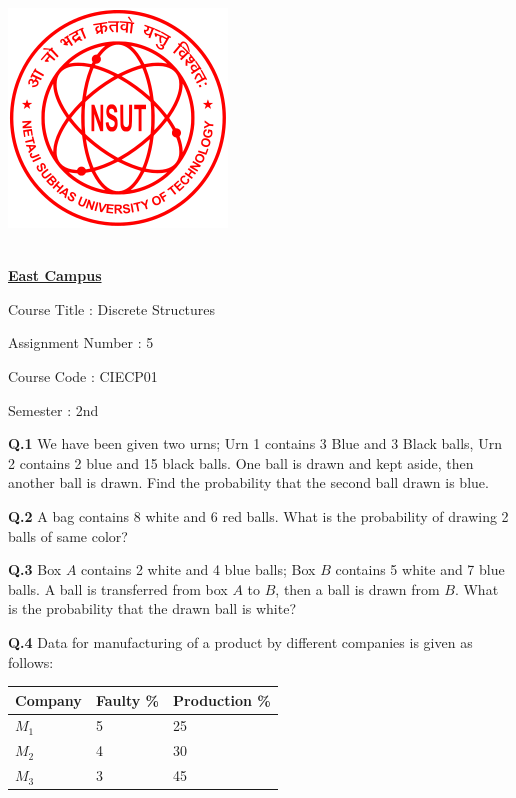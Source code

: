 \documentclass[11pt]{exam}
\begin{document}
\begin{center}
    \includegraphics[scale=.4]{Figures/NSUT.png}
    \bigskip

     \\ [.2cm]
    \underline{\textbf{East Campus}} \\
\end{center}

\begin{minipage}[t]{0.6\textwidth}
    Course Title : Discrete Structures \par
    Assignment Number : 5 \par
\end{minipage}
\begin{minipage}[t]{0.3\textwidth}
    Course Code : CIECP01\par
    Semester : 2nd\par
\end{minipage}
\bigskip
\bigskip

\textbf{Q.1} We have been given two urns; Urn 1 contains 3 Blue and 3 Black balls, Urn 2 contains 2 blue and 15 black balls. One ball is drawn and kept aside, then another ball is drawn. Find the probability that the second ball drawn is blue.

\bigskip
\textbf{Q.2} A bag contains 8 white and 6 red balls.
What is the probability of drawing 2 balls of same color?


\bigskip

\textbf{Q.3} Box $A$ contains 2 white and 4 blue balls; Box $B$ contains 5 white and 7 blue balls.
A ball is transferred from box $A$ to $B$, then a ball is drawn from $B$. What is the probability that the drawn ball is white?

\bigskip
\textbf{Q.4} Data for manufacturing of a product by different companies is given as follows:

\begin{table}[h!]
    \centering
    \begin{tabular}{lll}
        \hline
        Company & Faulty \% & Production \% \\ \hline
        $M_1$   & 5         & 25            \\
        $M_2$   & 4         & 30            \\
        $M_3$   & 3         & 45
    \end{tabular}
\end{table}
\end{document}
